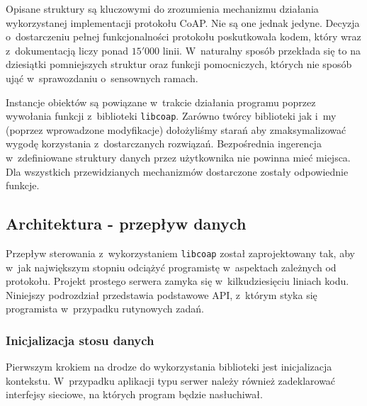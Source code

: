 Opisane struktury są kluczowymi do zrozumienia mechanizmu działania wykorzystanej implementacji protokołu CoAP. Nie są one jednak jedyne. Decyzja o~dostarczeniu pełnej funkcjonalności protokołu poskutkowała kodem, który wraz z~dokumentacją liczy ponad $15'000$ linii. W~naturalny sposób przekłada się to na dziesiątki pomniejszych struktur oraz funkcji pomocniczych, których nie sposób ująć w~sprawozdaniu o~sensownych ramach.

Instancje obiektów są powiązane w~trakcie działania programu poprzez wywołania funkcji z~biblioteki \verb|libcoap|. Zarówno twórcy biblioteki jak i~my (poprzez wprowadzone modyfikacje) dołożyliśmy starań aby zmaksymalizować wygodę korzystania z~dostarczanych rozwiązań. Bezpośrednia ingerencja w~zdefiniowane struktury danych przez użytkownika nie powinna mieć miejsca. Dla wszystkich przewidzianych mechanizmów dostarczone zostały odpowiednie funkcje.



\subsection{Architektura - przepływ danych}

Przepływ sterowania z~wykorzystaniem \verb|libcoap| został zaprojektowany tak, aby w~jak największym stopniu odciążyć programistę w~aspektach zależnych od protokołu. Projekt prostego serwera zamyka się w~kilkudziesięciu liniach kodu. Niniejszy podrozdział przedstawia podstawowe API, z~którym styka się programista w~przypadku rutynowych zadań.



\subsubsection{Inicjalizacja stosu danych}

Pierwszym krokiem na drodze do wykorzystania biblioteki jest inicjalizacja kontekstu. W~przypadku aplikacji typu serwer należy również zadeklarować interfejsy sieciowe, na których program będzie nasłuchiwał.

